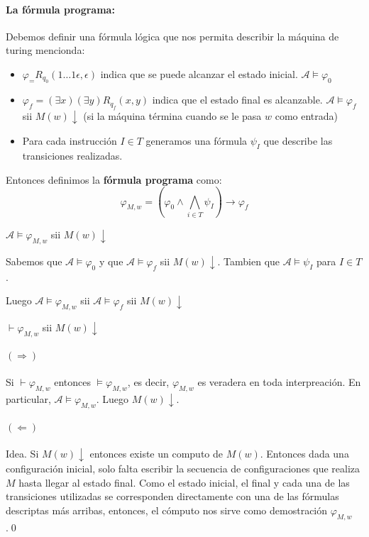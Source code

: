 \paragraph{La fórmula programa:} Debemos definir una fórmula lógica que nos permita describir la máquina de turing mencionda:

\begin{itemize}
	\item $\varphi_= R_{q_0}(1\dots1\epsilon, \epsilon)$ indica que se puede alcanzar el estado inicial. $\mathcal{A}\vDash\varphi_0$
	\item $\varphi_f = (\exists x)(\exists y) R_{q_f}(x,y)$ indica que el estado final es alcanzable. $\mathcal{A}\vDash\varphi_f$ sii $M(w)\downarrow$ (si la máquina términa cuando se le pasa $w$ como entrada)
	\item Para cada instrucción $I\in T$ generamos una fórmula $\psi_I$ que describe las transiciones realizadas.
\end{itemize}

Entonces definimos la \textbf{fórmula programa} como:
$$\varphi_{M,w} = (\varphi_0\land\bigwedge_{i\in T}\psi_I)\to\varphi_f$$

\begin{proposicion}
$\mathcal{A}\vDash\varphi_{M,w}$ sii $M(w)\downarrow$
\end{proposicion}

\begin{demo}
	Sabemos que $\mathcal{A}\vDash\varphi_0$ y que $\mathcal{A}\vDash\varphi_f$ sii $M(w)\downarrow$. Tambien que $\mathcal{A}\vDash\psi_I$ para $I\in T$.
	
	Luego $\mathcal{A}\vDash\varphi_{M,w}$ sii $\mathcal{A}\vDash\varphi_f$ sii $M(w)\downarrow$
\end{demo}

\begin{teorema}
	$\vdash\varphi_{M,w}$ sii $M(w)\downarrow$
\end{teorema}

\begin{demo}
	\paragraph{$\bm{(\Rightarrow)}$} Si $\vdash\varphi_{M,w}$ entonces $\vDash\varphi_{M,w}$, es decir, $\varphi_{M,w}$ es veradera en toda interpreación. En particular, $\mathcal{A}\vDash\varphi_{M,w}$. Luego $M(w)\downarrow$.
	
	\paragraph{$\bm{(\Leftarrow)}$} Idea. Si $M(w)\downarrow$ entonces existe un computo de $M(w)$. Entonces dada una configuración inicial, solo falta escribir la secuencia de configuraciones que realiza $M$ hasta llegar al estado final. Como el estado inicial, el final y cada una de las transiciones utilizadas se corresponden directamente con una de las fórmulas descriptas más arribas, entonces, el cómputo nos sirve como demostración $\varphi_{M,w}$.\qed
\end{demo}

